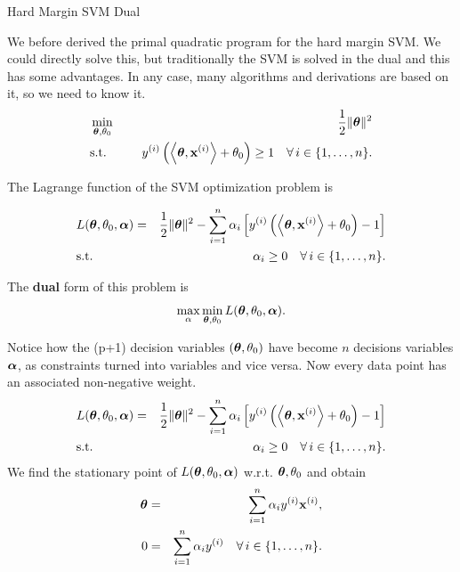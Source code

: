 \documentclass[11pt,compress,t,notes=noshow, xcolor=table]{beamer}
\begin{document}
\begin{vbframe}{Hard Margin SVM Dual}

We before derived the primal quadratic program for the hard margin SVM. We could directly solve this, but traditionally the SVM is solved in the dual and this has some advantages. In any case, many algorithms and derivations are based on it, so we need to know it.
  \begin{eqnarray*}
  & \min\limits_{\bm{\theta}, \theta_0} \quad & \frac{1}{2} \|\bm{\theta}\|^2 \\
  & \text{s.t.} & \,\,y^{(i)}  \left( \left\langle \bm{\theta}, \mathbf{x}^{(i)} \right\rangle + \theta_0 \right) \geq 1 \quad \forall\, i \in \{1, \ldots, n\}.
\end{eqnarray*}







The Lagrange function of the SVM optimization problem is

\vspace*{-.5cm}

\small
\begin{eqnarray*}
&L(\bm{\theta}, \theta_0, \bm{\alpha}) = & \frac{1}{2}\|\bm{\theta}\|^2  -  \sum_{i=1}^n \alpha_i \left[y^{(i)}  \left( \left\langle \bm{\theta}, \mathbf{x}^{(i)} \right\rangle + \theta_0 \right) - 1\right]\\
 & \text{s.t.} & \,\, \alpha_i \ge 0 \quad \forall\, i \in \{1, \ldots, n\}.
\end{eqnarray*}
\small

The \textbf{dual} form of this problem is
$$\max\limits_{\alpha} \min\limits_{\bm{\theta}, \theta_0}  L(\bm{\theta}, \theta_0,\bm{\alpha}).$$

\framebreak 

Notice how the (p+1) decision variables $(\bm{\theta},\theta_0)$ have become $n$ decisions variables $\bm{\alpha}$, as constraints turned into variables and vice versa.
Now every data point has an associated non-negative weight.
\begin{eqnarray*}
&L(\bm{\theta}, \theta_0, \bm{\alpha}) = & \frac{1}{2}\|\bm{\theta}\|^2  -  \sum_{i=1}^n \alpha_i \left[y^{(i)}  \left( \left\langle \bm{\theta}, \mathbf{x}^{(i)} \right\rangle + \theta_0 \right) - 1\right]\\
 & \text{s.t.} & \,\, \alpha_i \ge 0 \quad \forall\, i \in \{1, \ldots, n\}.
\end{eqnarray*}
We find the stationary point of $L(\bm{\theta}, \theta_0,\bm{\alpha})$ w.r.t. $\bm{\theta}, \theta_0$ and obtain
\begin{eqnarray*}
    \bm{\theta} & = & \sum_{i=1}^n \alpha_i y^{(i)} \mathbf{x}^{(i)}, \\
    0 & = & \sum_{i=1}^n \alpha_i y^{(i)} \quad \forall\, i \in \{1, \ldots, n\}.\\
\end{eqnarray*}



\end{vbframe}
\end{document}
